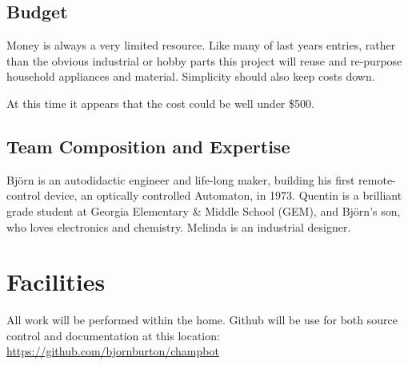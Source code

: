 \documentclass[]{article}
\begin{document}
\subsection{Budget}
Money is always a very limited resource.
Like many of last years entries, rather than the obvious industrial or hobby parts this project will reuse and re-purpose household appliances and material.
Simplicity should also keep costs down.

At this time it appears that the cost could be well under \$500.

   
\subsection{Team Composition and Expertise}
Bj{\"o}rn is an autodidactic engineer and life-long maker, building his first remote-control device, an optically controlled Automaton, in 1973.  
Quentin is a brilliant  grade student at Georgia Elementary \& Middle School (GEM), and Bj{\"o}rn's son, who loves electronics and chemistry.
Melinda is an industrial designer.


\section{Facilities}
All work will be performed within the home.
Github will be use for both source control and documentation at this location:
\url{https://github.com/bjornburton/champbot}
\end{document}
